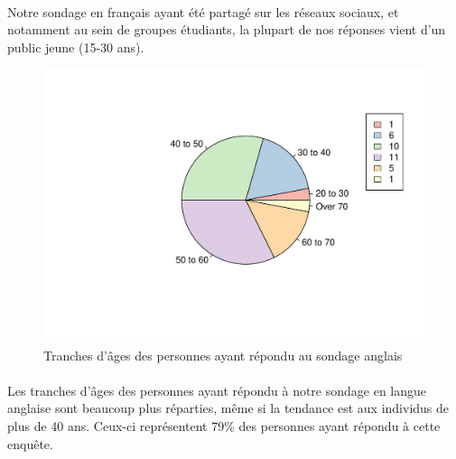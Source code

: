 \documentclass[12pt]{article}\usepackage[]{graphicx}\usepackage[]{color}
\makeatletter
\def\maxwidth{ %
  \ifdim\Gin@nat@width>\linewidth
    \linewidth
  \else
    \Gin@nat@width
  \fi
}
\newenvironment{knitrout}{}{} %
\makeatother
\begin{document}
\paragraph{} Notre sondage en français ayant été partagé sur les
réseaux sociaux, et notamment au sein de groupes étudiants, la plupart de nos
réponses vient d'un public jeune (15-30 ans).

\begin{knitrout}
\color{fgcolor}\begin{figure}[H]
\includegraphics[width=\maxwidth]{figure/tranche_age_en-1} \caption[Tranches d'âges des personnes ayant répondu au sondage anglais]{Tranches d'âges des personnes ayant répondu au sondage anglais}\label{fig:tranche age en}
\end{figure}


\end{knitrout}

\paragraph{} Les tranches d'âges des personnes ayant répondu à notre sondage
en langue anglaise sont beaucoup plus réparties, même si la tendance est aux
individus de plus de 40 ans. Ceux-ci représentent 79\% des personnes ayant
répondu à cette enquête.
\end{document}
